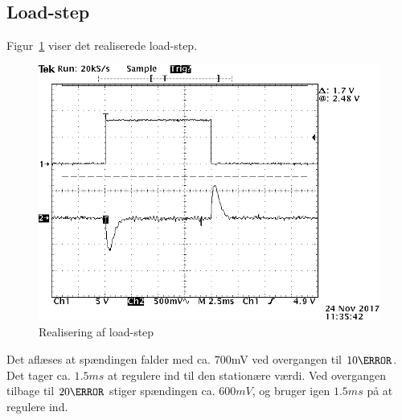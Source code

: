 \subsection{Load-step}
Figur~\ref{fig:belastningsamlet} viser det realiserede load-step.
\begin{figure}[H]
	\center
	\includegraphics[max width=0.7\linewidth]{../dokumentation/tex/2iteration/billeder/Realisering/belastningsamlet.png}
	\caption{Realisering af load-step}
	\label{fig:belastningsamlet}
\end{figure}
\noindent Det aflæses at spændingen falder med ca. 700mV ved overgangen til $10\ohm$. Det tager ca. $1.5ms$ at regulere ind til den stationære værdi. Ved overgangen tilbage til $20\ohm$ stiger spændingen ca. $600mV$, og bruger igen $1.5ms$ på at regulere ind.